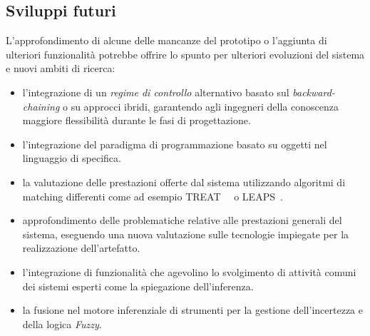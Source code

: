 \subsection{Sviluppi futuri}

L'approfondimento di alcune delle mancanze del prototipo o l'aggiunta di ulteriori funzionalità potrebbe offrire lo spunto per ulteriori evoluzioni del sistema e nuovi ambiti di ricerca:
\begin{itemize}
	\item l'integrazione di un \emph{regime di controllo} alternativo basato sul \emph{backward-chaining} o su approcci ibridi, garantendo agli ingegneri della conoscenza maggiore flessibilità durante le fasi di progettazione.
	
	\item l'integrazione del paradigma di programmazione basato su oggetti nel linguaggio di specifica.
	
	\item la valutazione delle prestazioni offerte dal sistema utilizzando algoritmi di matching differenti come ad esempio TREAT~\cite{Miranker:1987:TBM:899610}~\cite{Miranker:1987:TBM:1856670.1856678} o LEAPS~\cite{Batory:1994:LA:899216}.	
	
	\item approfondimento delle problematiche relative alle prestazioni generali del sistema, eseguendo una nuova valutazione sulle tecnologie impiegate per la realizzazione dell'artefatto.
	
	\item l'integrazione di funzionalità che agevolino lo svolgimento di attività comuni  dei sistemi esperti come la spiegazione dell'inferenza.
	
	\item la fusione nel motore inferenziale di strumenti per la gestione dell'incertezza e della logica \emph{Fuzzy}.
\end{itemize}
